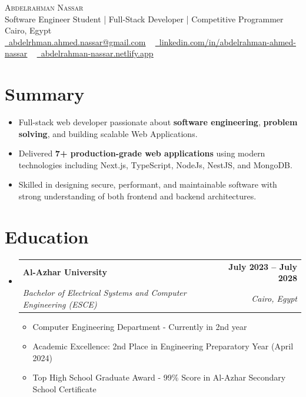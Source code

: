 \documentclass[letterpaper,11pt]{article}
\makeatletter
\newcommand{\resumeItem}[1]{
  \item\small{
    {#1 \vspace{-2pt}}
  }
}
\newcommand{\resumeSubheading}[4]{
  \vspace{-2pt}\item
    \begin{tabular*}{1.0\textwidth}[t]{l@{\extracolsep{\fill}}r}
      \textbf{#1} & \textbf{\small #2} \\
      \textit{\small#3} & \textit{\small #4} \\
    \end{tabular*}\vspace{-7pt}
}
\newcommand{\resumeSubHeadingListStart}{\begin{itemize}[leftmargin=0.0in, label={}]}
\newcommand{\resumeSubHeadingListEnd}{\end{itemize}}
\newcommand{\resumeItemListStart}{\begin{itemize}}
\newcommand{\resumeItemListEnd}{\end{itemize}\vspace{-5pt}}
\makeatother
\begin{document}
\begin{center}
    {\Huge \scshape Abdelrahman Nassar} \\ \vspace{5pt}
    Software Engineer Student | Full-Stack Developer | Competitive Programmer \\ \vspace{5pt}
    Cairo, Egypt \\ \vspace{5pt}
    \small
    \href{mailto:abdelrhman.ahmed.nassar@gmail.com}{\raisebox{-0.2\height}\faEnvelope\  \underline{abdelrhman.ahmed.nassar@gmail.com}} ~ 
    \href{https://www.linkedin.com/in/abdelrahman-ahmed-nassar}{\raisebox{-0.2\height}\faLinkedin\ \underline{linkedin.com/in/abdelrahman-ahmed-nassar}}  ~
    \href{https://abdelrahman-nassar.netlify.app}{\raisebox{-0.2\height}\faGlobe\ \underline{abdelrahman-nassar.netlify.app}}
    \vspace{-8pt}
\end{center}

\section{Summary}
\vspace{-3pt}
\resumeSubHeadingListStart
  \resumeItem{Full-stack web developer passionate about \textbf{software engineering}, \textbf{problem solving}, and building scalable Web Applications.}
  \resumeItem{Delivered \textbf{7+ production-grade web applications} using modern technologies including Next.js, TypeScript, NodeJs, NestJS, and MongoDB.}
  \resumeItem{Skilled in designing secure, performant, and maintainable software with strong understanding of both frontend and backend architectures.}
\resumeSubHeadingListEnd
\vspace{-10pt}


\section{Education}
  \resumeSubHeadingListStart
    \resumeSubheading
      {Al-Azhar University}{July 2023 -- July 2028}
      {Bachelor of Electrical Systems and Computer Engineering (ESCE)}{Cairo, Egypt}
      \resumeItemListStart
        \resumeItem{Computer Engineering Department - Currently in 2nd year}
        \resumeItem{Academic Excellence: 2nd Place in Engineering Preparatory Year (April 2024)}
        \resumeItem{Top High School Graduate Award - 99\% Score in Al-Azhar Secondary School Certificate}
      \resumeItemListEnd
  \resumeSubHeadingListEnd
\end{document}
